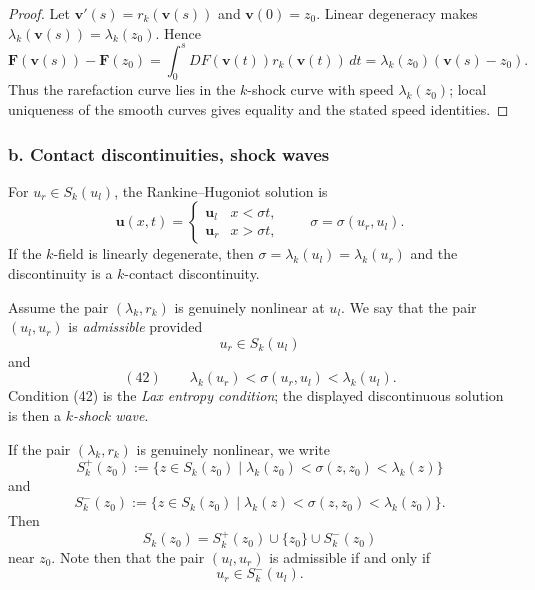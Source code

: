 \begin{proof}
\sketch Let $\mathbf v'(s)=r_k(\mathbf v(s))$ and $\mathbf v(0)=z_0$. Linear degeneracy makes $\lambda_k(\mathbf v(s))=\lambda_k(z_0)$. Hence
\[
\mathbf F(\mathbf v(s))-\mathbf F(z_0)
=\int_0^sDF(\mathbf v(t))r_k(\mathbf v(t))\,dt
=\lambda_k(z_0)(\mathbf v(s)-z_0).
\]
Thus the rarefaction curve lies in the $k$-shock curve with speed $\lambda_k(z_0)$; local uniqueness of the smooth curves gives equality and the stated speed identities.
\end{proof}

\subsubsection*{b. Contact discontinuities, shock waves}

For $u_r\in S_k(u_l)$, the Rankine--Hugoniot solution is
\[
\mathbf u(x,t)=
\begin{cases}
\mathbf u_l & x<\sigma t,\\
\mathbf u_r & x>\sigma t,
\end{cases}
\qquad \sigma=\sigma(u_r,u_l).
\]
If the $k$-field is linearly degenerate, then
$\sigma=\lambda_k(u_l)=\lambda_k(u_r)$ and the discontinuity is a $k$-contact discontinuity.

\begin{definition}
\label{def:admissible-pair-lax-entropy-condition}
Assume the pair $(\lambda_k, r_k)$ is genuinely nonlinear at $u_l$. We say that the pair $(u_l, u_r)$ is \textit{admissible} provided
$$u_r \in S_k(u_l)$$
and
$$(42) \qquad \lambda_k(u_r) < \sigma(u_r,u_l) < \lambda_k(u_l).$$
Condition (42) is the \textit{Lax entropy condition}; the displayed discontinuous solution is then a \textit{$k$-shock wave}.
\end{definition}

\begin{definition}[$S_k^+$ and $S_k^-$]
\label{def:shock-set-plus-minus}
If the pair $(\lambda_k, r_k)$ is genuinely nonlinear, we write
$$S_k^+(z_0) := \{z\in S_k(z_0) \mid \lambda_k(z_0) < \sigma(z,z_0) < \lambda_k(z)\}$$
and
$$S_k^-(z_0) := \{z\in S_k(z_0) \mid \lambda_k(z) < \sigma(z,z_0) < \lambda_k(z_0)\}.$$
Then
$$S_k(z_0) = S_k^+(z_0) \cup \{z_0\} \cup S_k^-(z_0)$$
near $z_0$. Note then that the pair $(u_l, u_r)$ is admissible if and only if
$$u_r \in S_k^-(u_l).$$
\end{definition}


